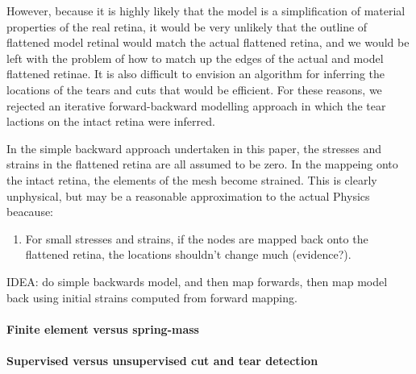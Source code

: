 \documentclass{article}
\begin{document}
However, because it is highly likely that the model is a
simplification of material properties of the real retina, it would be
very unlikely that the outline of flattened model retinal would match
the actual flattened retina, and we would be left with the problem of
how to match up the edges of the actual and model flattened
retinae. It is also difficult to envision an algorithm for inferring
the locations of the tears and cuts that would be efficient. For these
reasons, we rejected an iterative forward-backward modelling approach
in which the tear lactions on the intact retina were inferred.

In the simple backward approach undertaken in this paper, the stresses
and strains in the flattened retina are all assumed to be zero. In the
mappeing onto the intact retina, the elements of the mesh become
strained. This is clearly unphysical, but may be a reasonable
approximation to the actual Physics beacause:
\begin{enumerate}
\item For small stresses and strains, if the nodes are mapped back
  onto the flattened retina, the locations shouldn't change much
  (evidence?).
\end{enumerate}

IDEA: do simple backwards model, and then map forwards, then map model
back using initial strains computed from forward mapping.

\paragraph{Finite element versus spring-mass}
\label{fold-sphere:sec:finite-elem-vers}

\paragraph{Supervised versus unsupervised cut and tear detection}
\label{fold-sphere:sec:superv-vers-unsup}
\end{document}
